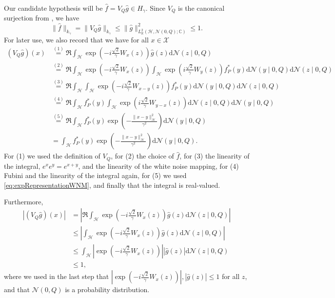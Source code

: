 \documentclass[letterpaper]{article} %
\newcommand{\R}{\mathbb{R}}
\newcommand{\hs}[1]{\mathcal{#1}} %
\newcommand{\inputSet}{\mathcal{X}} %
\newcommand{\Normal}{\mathcal{N}}
\newcommand{\C}{\mathbb{C}}
\newcommand{\stp}[2]{{\overset{(#2)}{#1}}}
\newcommand{\stpx}[1]{{(#1)}}
\begin{document}
Our candidate hypothesis will be $\hat f = V_Q \hat g \in H_\gamma$.
Since $V_Q$ is the canonical surjection from , we have
\begin{equation*}
    \|\hat f\|_{k_\gamma} = \|V_Q \hat g\|_{k_\gamma} \leq \|\hat g\|_{L^2_\R(\hs{H},\Normal(0,Q);\C)}^2 \leq 1.
\end{equation*}
For later use, we also record that we have for all $x\in\inputSet$
\begin{align*}
    (V_Q \hat g)(x) & \stp{=}{1} \Re \int_\hs{H} \exp\left(-i \frac{\sqrt{2}}{\gamma} W_x(z) \right)\hat{g}(z)\mathrm{d}\Normal(z\mid 0,Q) \\
    & \stp{=}{2} \Re \int_\hs{H} \exp\left(-i \frac{\sqrt{2}}{\gamma} W_x(z) \right)
        \int_\hs{H} \exp\left(i \frac{\sqrt{2}}{\gamma} W_y(z)\right) f_P^\ast(y) 
        \mathrm{d}\Normal(y\mid 0,Q)\mathrm{d}\Normal(z\mid 0,Q) \\
    & \stp{=}{3} \Re \int_\hs{H}  
        \int_\hs{H} \exp\left(-i \frac{\sqrt{2}}{\gamma} W_{x-y}(z) \right)f_P^\ast(y) \mathrm{d}\Normal(y\mid 0,Q)
        \mathrm{d}\Normal(z\mid 0,Q) \\
    & \stp{=}{4} \Re \int_\hs{H} f_P^\ast(y) 
        \int_\hs{H}\exp\left(i \frac{\sqrt{2}}{\gamma} W_{y-x}(z) \right)\mathrm{d}\Normal(z\mid 0,Q) 
        \mathrm{d}\Normal(y\mid 0,Q) \\
    & \stp{=}{5}  \Re \int_\hs{H} f_P^\ast(y) 
        \exp\left(-\frac{\|x-y\|_\hs{H}^2}{\gamma^2}\right)
        \mathrm{d}\Normal(y\mid 0,Q) \\
    & = \int_\hs{H} f_P^\ast(y) 
        \exp\left(-\frac{\|x-y\|_\hs{H}^2}{\gamma^2}\right)
        \mathrm{d}\Normal(y\mid 0,Q).
\end{align*}
For \stpx{1} we used the definition of $V_Q$,
for \stpx{2} the choice of $\hat f$,
for \stpx{3} the linearity of the integral, $e^xe^y=e^{x+y}$, and the linearity of the white noise mapping,
for \stpx{4} Fubini and the linearity of the integral again,
for \stpx{5} we used \eqref{eq:expRepresentationWNM},
and finally that the integral is real-valued.

Furthermore,
\begin{align*}
    |(V_Q \hat g)(x)| & = \left|  \Re \int_\hs{H} \exp\left(-i \frac{\sqrt{2}}{\gamma} W_x(z)\right)\hat g(z)\mathrm{d}\Normal(z\mid 0, Q) \right| \\
    & \leq \left|  \int_\hs{H} \exp\left(-i \frac{\sqrt{2}}{\gamma} W_x(z)\right)\hat g(z)\mathrm{d}\Normal(z\mid 0, Q) \right| \\
    & \leq  \int_\hs{H} \left|\exp\left(-i \frac{\sqrt{2}}{\gamma} W_x(z)\right)\right| |\hat g(z)|\mathrm{d}\Normal(z\mid 0, Q) \\
    & \leq 1,
\end{align*}
where we used in the last step that $\left|\exp\left(-i \frac{\sqrt{2}}{\gamma} W_x(z)\right)\right|, |\hat g(z)|\leq 1$ for all $z$, and that $\Normal(0, Q)$ is a probability distribution.
\end{document}
